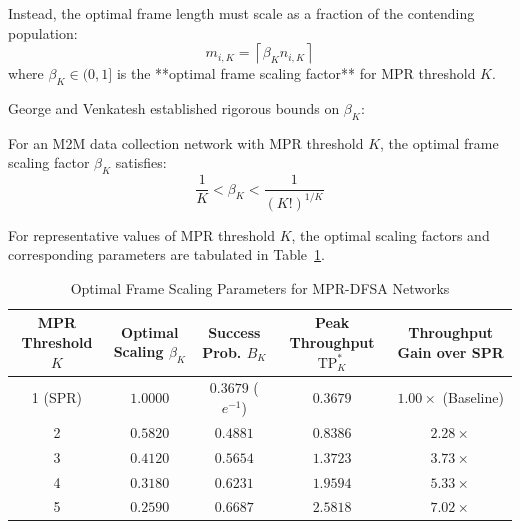 Instead, the optimal frame length must scale as a fraction of the contending population:
\begin{equation}
    m_{i, K} = \left\lceil \beta_K n_{i, K} \right\rceil
\end{equation}
where $\beta_K \in (0, 1]$ is the **optimal frame scaling factor** for MPR threshold $K$.

George and Venkatesh \cite{george2020multipacket} established rigorous bounds on $\beta_K$:
\begin{lemma}
\label{lem:beta_K_bounds}
For an M2M data collection network with MPR threshold $K$, the optimal frame scaling factor $\beta_K$ satisfies:
\begin{equation}
    \label{eq:beta_K_bounds}
    \frac{1}{K} < \beta_K < \frac{1}{(K!)^{1/K}}
\end{equation}
\end{lemma}

For representative values of MPR threshold $K$, the optimal scaling factors and corresponding parameters are tabulated in Table~\ref{tab:mpr_scaling_params}.

\begin{table}[htbp]
\centering
\caption{Optimal Frame Scaling Parameters for MPR-DFSA Networks \cite{george2020multipacket}}
\label{tab:mpr_scaling_params}
\begin{tabular}{ccccc}
\toprule
\textbf{MPR Threshold $K$} & \textbf{Optimal Scaling $\beta_K$} & \textbf{Success Prob. $B_K$} & \textbf{Peak Throughput $\mathrm{TP}_K^*$} & \textbf{Throughput Gain over SPR} \\
\midrule
1 (SPR) & $1.0000$ & $0.3679$ ($e^{-1}$) & $0.3679$ & $1.00\times$ (Baseline) \\
2 & $0.5820$ & $0.4881$ & $0.8386$ & $2.28\times$ \\
3 & $0.4120$ & $0.5654$ & $1.3723$ & $3.73\times$ \\
4 & $0.3180$ & $0.6231$ & $1.9594$ & $5.33\times$ \\
5 & $0.2590$ & $0.6687$ & $2.5818$ & $7.02\times$ \\
\bottomrule
\end{tabular}
\end{table}

